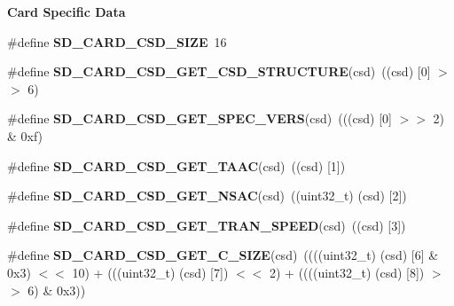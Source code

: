 \begin{Indent}\textbf{ Card Specific Data}\par
\begin{DoxyCompactItemize}
\item 
\mbox{\label{spi-sd-card_8c_a4fbd3d8e07d3a94f7400e8b6513fd620}} 
\#define {\bfseries S\+D\+\_\+\+C\+A\+R\+D\+\_\+\+C\+S\+D\+\_\+\+S\+I\+ZE}~16
\item 
\mbox{\label{spi-sd-card_8c_ae62910dc97103ad8abaf52921c202a3a}} 
\#define {\bfseries S\+D\+\_\+\+C\+A\+R\+D\+\_\+\+C\+S\+D\+\_\+\+G\+E\+T\+\_\+\+C\+S\+D\+\_\+\+S\+T\+R\+U\+C\+T\+U\+RE}(csd)~((csd) \mbox{[}0\mbox{]} $>$$>$ 6)
\item 
\mbox{\label{spi-sd-card_8c_a688c13e244a05f6f97ed54d4856663d4}} 
\#define {\bfseries S\+D\+\_\+\+C\+A\+R\+D\+\_\+\+C\+S\+D\+\_\+\+G\+E\+T\+\_\+\+S\+P\+E\+C\+\_\+\+V\+E\+RS}(csd)~(((csd) \mbox{[}0\mbox{]} $>$$>$ 2) \& 0xf)
\item 
\mbox{\label{spi-sd-card_8c_abef001802959c8b95218da8ec43087e3}} 
\#define {\bfseries S\+D\+\_\+\+C\+A\+R\+D\+\_\+\+C\+S\+D\+\_\+\+G\+E\+T\+\_\+\+T\+A\+AC}(csd)~((csd) \mbox{[}1\mbox{]})
\item 
\mbox{\label{spi-sd-card_8c_a55780ad7fea22b844a6c87e427b7a5e6}} 
\#define {\bfseries S\+D\+\_\+\+C\+A\+R\+D\+\_\+\+C\+S\+D\+\_\+\+G\+E\+T\+\_\+\+N\+S\+AC}(csd)~((uint32\+\_\+t) (csd) \mbox{[}2\mbox{]})
\item 
\mbox{\label{spi-sd-card_8c_a0f25f80c819ada8d1f86d443d005704a}} 
\#define {\bfseries S\+D\+\_\+\+C\+A\+R\+D\+\_\+\+C\+S\+D\+\_\+\+G\+E\+T\+\_\+\+T\+R\+A\+N\+\_\+\+S\+P\+E\+ED}(csd)~((csd) \mbox{[}3\mbox{]})
\item 
\mbox{\label{spi-sd-card_8c_ae2d0bd0f1b34a1688ddf842483555a2b}} 
\#define {\bfseries S\+D\+\_\+\+C\+A\+R\+D\+\_\+\+C\+S\+D\+\_\+\+G\+E\+T\+\_\+\+C\+\_\+\+S\+I\+ZE}(csd)~((((uint32\+\_\+t) (csd) \mbox{[}6\mbox{]} \& 0x3) $<$$<$ 10) + (((uint32\+\_\+t) (csd) \mbox{[}7\mbox{]}) $<$$<$ 2) + ((((uint32\+\_\+t) (csd) \mbox{[}8\mbox{]}) $>$$>$ 6) \& 0x3))
\item 
\mbox{\label{spi-sd-card_8c_a91c18b379598ed906e39929c48833002}} 
$$
\end{DoxyCompactItemize}
\end{Indent}
